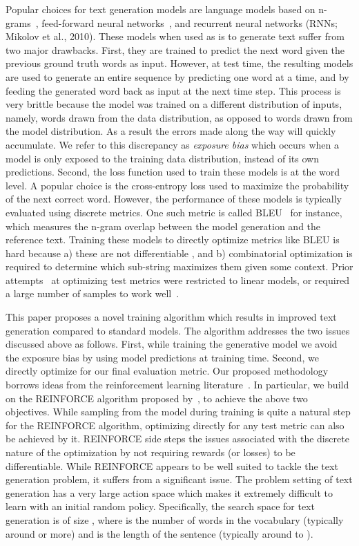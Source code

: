 \documentclass{article} \usepackage{iclr2016_conference,times}
\begin{document}
Popular choices for text generation models are language models based on n-grams~\citep{kneser+ney1995}, feed-forward neural networks~\citep{nlm}, and recurrent neural networks (RNNs; Mikolov et al., 2010)\nocite{mikolov-2010}. These models when used as is to generate text suffer from two major drawbacks. First, they are trained to predict the next word given the previous ground truth words as input. 
However, at test time, the resulting models are used to generate an entire sequence by predicting one word at a time, and by feeding the generated word back as input at the next time step.
This process is very brittle because the model was trained on a different distribution of inputs, namely, words drawn from the data distribution, as opposed to words drawn from the model distribution. As a result the errors made along the way will quickly accumulate.
We refer to this discrepancy as \textit{exposure bias} which occurs when a model is only exposed to the training data distribution, instead of its own predictions. 
Second, the loss function used to train these models is at the word level. A popular choice is the cross-entropy loss used to maximize the probability of the next correct word. However, the performance of these models is typically evaluated using discrete metrics. One such metric is called BLEU~\citep{bleu} for instance, which measures the n-gram overlap between the model generation and the reference text. Training these models to directly optimize metrics like BLEU is hard because a) these are not differentiable \citep{rosti2011}, and b) combinatorial optimization is required to determine which sub-string maximizes them given some context. Prior attempts~\citep{mcallister2010,he12} at optimizing test metrics were restricted to linear models, or required a large number of samples to work well~\citep{auli2014}.

This paper proposes a novel training algorithm which results in improved text generation compared to standard models. The algorithm addresses the two issues discussed above as follows. First, while training the generative model we avoid the exposure bias by using model predictions at training time. Second, we directly optimize for our final evaluation metric. Our proposed methodology borrows ideas from the reinforcement learning literature~\citep{sutton-rl}. In particular, we build on the REINFORCE algorithm proposed by~\citet{reinforce}, to achieve the above two objectives. While sampling from the model during training is quite a natural step for the REINFORCE algorithm, optimizing directly for any test metric can also be achieved by it. REINFORCE side steps the issues associated with the discrete nature of the optimization by not requiring rewards (or losses) to be differentiable. 
While REINFORCE appears to be well suited to tackle the text generation problem, it suffers from a significant issue. 
The problem setting of text generation has a very large action space which makes it extremely difficult to learn with an initial random policy.
Specifically, the search space for text generation is of size , where   is the number of words in the vocabulary (typically around  or more) and  is the length of the sentence (typically around  to ). 
\end{document}
